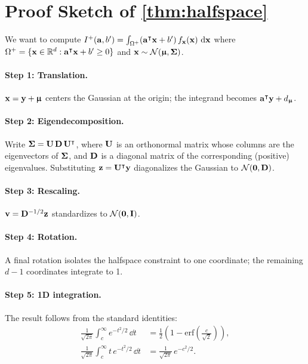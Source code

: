 \documentclass[11pt, letterpaper]{article}
\newcommand{\bSigma}{\vb{\Sigma}}
\newcommand{\bmu}{\boldsymbol{\upmu}}
\newcommand{\R}{\mathbb{R}}
\newcommand{\Norm}{\mathcal{N}}
\begin{document}
\section{Proof Sketch of \cref{thm:halfspace}}\label{app:proof}

We want to compute $I^+(\vb{a}, b') = \int_{\Omega^+} (\vb{a}^{\intercal} \vb{x} + b')\, f_{\vb{x}}(\vb{x})\, \dd{\vb{x}}$ where $\Omega^+ = \{\vb{x} \in \R^d : \vb{a}^{\intercal} \vb{x} + b' \geq 0\}$ and $\vb{x} \sim \Norm(\bmu, \bSigma)$.

\paragraph{Step 1: Translation.} $\vb{x} = \vb{y} + \bmu$ centers the Gaussian at the origin; the integrand becomes $\vb{a}^{\intercal} \vb{y} + d_{\bmu}$.

\paragraph{Step 2: Eigendecomposition.} Write $\bSigma = \vb{U}\,\vb{D}\,\vb{U}^{\intercal}$, where $\vb{U}$ is an orthonormal matrix whose columns are the eigenvectors of $\bSigma$, and $\vb{D}$ is a diagonal matrix of the corresponding (positive) eigenvalues. Substituting $\vb{z} = \vb{U}^{\intercal}\vb{y}$ diagonalizes the Gaussian to $\Norm(\vb{0}, \vb{D})$.

\paragraph{Step 3: Rescaling.} $\vb{v} = \vb{D}^{-1/2}\vb{z}$ standardizes to $\Norm(\vb{0}, \vb{I})$.

\paragraph{Step 4: Rotation.} A final rotation isolates the halfspace constraint to one coordinate; the remaining $d-1$ coordinates integrate to 1.

\paragraph{Step 5: 1D integration.} The result follows from the standard identities:
\begin{align}
    \frac{1}{\sqrt{2\pi}} \int_c^{\infty} e^{-t^2/2}\, \dd{t} &= \frac{1}{2}\left(1 - \mathrm{erf}\!\left(\frac{c}{\sqrt{2}}\right)\right), \\
    \frac{1}{\sqrt{2\pi}} \int_c^{\infty} t\, e^{-t^2/2}\, \dd{t} &= \frac{1}{\sqrt{2\pi}}\, e^{-c^2/2}.
\end{align}

\pagebreak
\printbibliography
\end{document}

